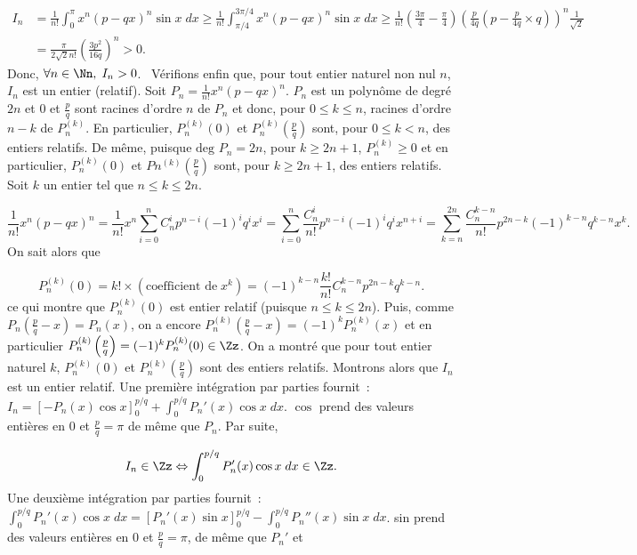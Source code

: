 {\begin{enumerate}
{\begin{align*}
I_n&=\frac{1}{n!}\int_{0}^{\pi}x^n(p-qx)^n\sin x\;dx\geq\frac{1}{n!}\int_{\pi/4}^{3\pi/4}x^n(p-qx)^n\sin x\;dx\geq
\frac{1}{n!}\left(\frac{3\pi}{4}-\frac{\pi}{4}\right)\left(\frac{p}{4q}\left(p-\frac{p}{4q}\times q\right)\right)^n\frac{1}{\sqrt{2}}\\
 &=\frac{\pi}{2\sqrt{2}n!}\left(\frac{3p^2}{16q}\right)^n>0.
\end{align*}
Donc, $\forall n\in\Nn,\;I_n>0$.
\textbullet~Vérifions enfin que, pour tout entier naturel non nul $n$, $I_n$ est un entier (relatif).
Soit $P_n=\frac{1}{n!}x^n(p-qx)^n$. $P_n$ est un polynôme de degré $2n$ et $0$ et $\frac{p}{q}$ sont racines d'ordre $n$ de $P_n$ et donc, pour $0\leq k\leq n$, racines d'ordre $n-k$ de $P_n^{(k)}$. En particulier, $P_n^{(k)}(0)$ et $P_n^{(k)}\left(\frac{p}{q}\right)$ sont, pour $0\leq k<n$, des entiers relatifs. De même, puisque $\mbox{deg }P_n=2n$, pour $k\geq2n+1$, $P_n^{(k)}\geq0$ et en particulier, $P_n^{(k)}(0)$ et $Pn^{(k)}\left(\frac{p}{q}\right)$ sont, pour $k\geq2n+1$, des entiers relatifs.
Soit $k$ un entier tel que $n\leq k\leq2n$.

$$\frac{1}{n!}x^n(p-qx)^n=\frac{1}{n!}x^n\sum_{i=0}^{n}C_n^ip^{n-i}(-1)^{i}q^ix^i
=\sum_{i=0}^{n}\frac{C_n^i}{n!}p^{n-i}(-1)^{i}q^ix^{n+i}=
\sum_{k=n}^{2n}\frac{C_n^{k-n}}{n!}p^{2n-k}(-1)^{k-n}q^{k-n}x^{k}.$$
On sait alors que 

$$P_n^{(k)}(0)=k!\times(\mbox{coefficient de}\;x^k)=(-1)^{k-n}\frac{k!}{n!}C_n^{k-n}p^{2n-k}q^{k-n}.$$
ce qui montre que $P_n^{(k)}(0)$ est entier relatif (puisque $n\leq k\leq2n$). Puis, comme $P_n\left(\frac{p}{q}-x\right)=P_n(x)$, on a encore 
$P_n^{(k)}\left(\frac{p}{q}-x\right)=(-1)^kP_n^{(k)}(x)$  et en particulier $P_n^{(k)}\left(\frac{p}{q}\right)=(-1)^kP_n^{(k)}(0)\in\Zz$.
On a montré que pour tout entier naturel $k$, $P_n^{(k)}(0)$ et $P_n^{(k)}\left(\frac{p}{q}\right)$ sont des entiers relatifs.
Montrons alors que $I_n$ est un entier relatif.
Une première intégration par parties fournit~:~$I_n=\left[-P_n(x)\cos x\right]_{0}^{p/q}+\int_{0}^{p/q}P_n'(x)\cos x\;dx$.
$\cos$ prend des valeurs entières en $0$ et  $\frac{p}{q}=\pi$ de même que $P_n$. Par suite,
 
$$I_n\in\Zz\Leftrightarrow\int_{0}^{p/q}P_n'(x)\cos x\;dx\in\Zz.$$
Une deuxième intégration par parties fournit~:~$\int_{0}^{p/q}P_n'(x)\cos x\;dx=\left[P_n'(x)\sin x\right]_{0}^{p/q}-\int_{0}^{p/q}P_n''(x)\sin x\;dx$.
sin prend des valeurs entières en $0$ et $\frac{p}{q}=\pi$, de même que $P_n'$ et 

}
\end{enumerate}}
